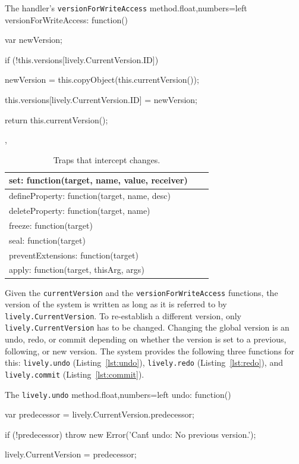 \begin{code}{The handler's \lstinline{versionForWriteAccess} method.}{float,numbers=left}
versionForWriteAccess: function() {
    var newVersion;
    
    if (!this.versions[lively.CurrentVersion.ID]) {
        newVersion = this.copyObject(this.currentVersion());
        
        this.versions[lively.CurrentVersion.ID] = newVersion;
    }
    
    return this.currentVersion();
},
\end{code}
\iffalse
\end{verbatim}\fi

\begin{table}[h]
\begin{center}
\begin{tabular}{|l|l|r|}
\hline
set: function(target, name, value, receiver) \\ \hline
defineProperty: function(target, name, desc) \\ \hline
deleteProperty: function(target, name) \\ \hline
freeze: function(target) \\ \hline
seal: function(target) \\ \hline
preventExtensions: function(target) \\ \hline
apply: function(target, thisArg, args) \\ \hline
\end{tabular}
\caption[Table caption text]{Traps that intercept changes.}
\label{table:writeTraps}
\end{center}
\end{table}

Given the \lstinline{currentVersion} and the \lstinline{versionForWriteAccess} functions, the version of the system is written as long as it is referred to by \lstinline{lively.CurrentVersion}.
To re-establish a different version, only \lstinline{lively.CurrentVersion} has to be changed.
Changing the global version is an undo, redo, or commit depending on whether the version is set to a previous, following, or new version.
The system provides the following three functions for this: \lstinline{lively.undo} (Listing~\ref{lst:undo}), \lstinline{lively.redo} (Listing~\ref{lst:redo}), and \lstinline{lively.commit} (Listing~\ref{lst:commit}).

\begin{code}{The \lstinline{lively.undo} method.}{float,numbers=left}
undo: function() {
    var predecessor = lively.CurrentVersion.predecessor;
    
    if (!predecessor) {
        throw new Error('Can\'t undo: No previous version.');
    }
    
    lively.CurrentVersion = predecessor;
}
\end{code}
\iffalse
\end{verbatim}\fi

